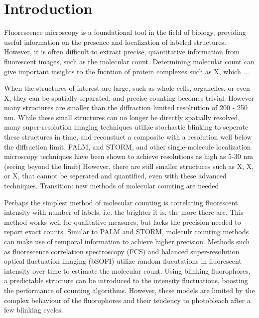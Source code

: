 \section{Introduction}


Fluorescence microscopy is a foundational tool in the field of biology,
  providing useful information on the presence and localization 
  of labeled structures.
%
  However, it is often difficult to extract precise, quantitative information
  from fluorescent images, such as the molecular count.
  Determining molecular count can give important insights to the fucntion
  of protein complexes such as X, which ...

When the structures of interest are large, such as whole cells, organelles,
  or even X, they can be spatially separated, and precise counting becomes trivial.
  However many structures are smaller than the diffraction limited resoltution of 200 - 250 nm.
%
While these small structures can no longer be directly spatially resolved, many super-resolution 
  imaging techniques utilize stochastic blinking to seperate these structures in time,
  and reconstuct a composite with a resolution well below the diffraction limit. 
  PALM, and STORM, and other single-molecule localization microscopy techniques
  have been shown to achieve resolutions as high as 5-30 nm (seeing beyond the limit)
  However, there are still smaller structures such as X, X, or X, that 
  cannot be seperated and quantified, even with these advanced techniques. 
  Transition: new methods of molecular counting are needed

Perhaps the simplest method of molecular counting is correlating fluorescent
    intensity with number of labels. i.e. the brighter it is, the more there are. 
    This method works well for qualitative measures, but lacks the precision needed 
    to report exact counts. 
    Similar to PALM and STORM, moleculr counting methods can make use of temporal information
    to achieve higher precision.
    Methods such as fluorescence correlation spectroscopy (FCS) and 
    balanced super-resolution optical fluctuation imaging (bSOFI)
    utilize random flucutations in fluorescent intensity over time to estimate the molecular count.
    Using blinking fluorophores, a predictable structure can be introduced 
    to the intensity fluctuations, boosting the performance of counting algorithms.
    However, these models are limited by the complex behaviour of the fluorophores and their
    tendency to photobleach after a few blinking cycles.


